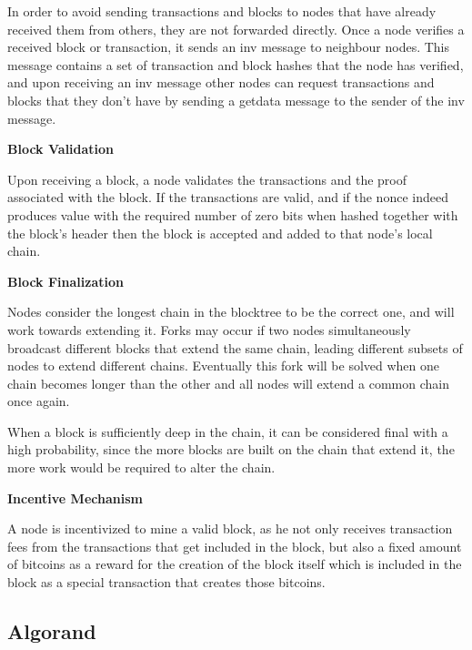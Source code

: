 In order to avoid sending transactions and blocks to nodes that have already received them from others, they are not forwarded directly. Once  a node verifies a received block or transaction, it sends an inv message to neighbour nodes. This message contains a set of transaction and block hashes that the node has verified, and upon receiving an inv message other nodes can request transactions and blocks that they don’t have by sending a getdata message to the sender of the inv message.

\vspace{0.25cm}

\textbf{Block Validation}

Upon receiving a block, a node validates the transactions and the proof associated with the block. If the transactions are valid, and if the nonce indeed produces value with the required number of zero bits when hashed together with the block’s header then the block is accepted and added to that node’s local chain.

\vspace{0.25cm}

\textbf{Block Finalization}

Nodes consider the longest chain in the blocktree to be the correct one, and will work towards extending it. Forks may occur if two nodes simultaneously broadcast different blocks that extend the same chain, leading different subsets of nodes to extend different chains. Eventually this fork will be solved when one chain becomes longer than the other and all nodes will extend a common chain once again.

When a block is sufficiently deep in the chain, it can be considered final with a high probability, since the more blocks are built on the chain that extend it, the more work would be required to alter the chain.


\vspace{0.25cm}

\textbf{Incentive Mechanism}

A node is incentivized to mine a valid block, as he not only receives transaction fees from the transactions that get included in the block, but also a fixed amount of bitcoins as a reward for the creation of the block itself which is included in the block as a special transaction that creates those bitcoins.




\subsection{Algorand}


